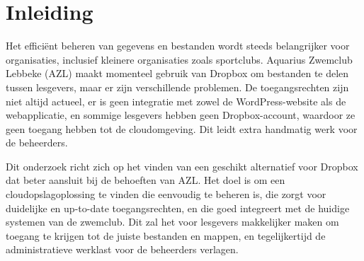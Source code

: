 


% 

\section{Inleiding}%
\label{sec:inleiding}

Het efficiënt beheren van gegevens en bestanden wordt steeds belangrijker voor organisaties, 
inclusief kleinere organisaties zoals sportclubs. Aquarius Zwemclub Lebbeke (AZL) maakt momenteel 
gebruik van Dropbox om bestanden te delen tussen lesgevers, maar er zijn verschillende problemen. 
De toegangsrechten zijn niet altijd actueel, er is geen integratie met zowel de WordPress-website als de webapplicatie, en sommige 
lesgevers hebben geen Dropbox-account, waardoor ze geen toegang hebben tot de cloudomgeving. 
Dit leidt extra handmatig werk voor de beheerders.

Dit onderzoek richt zich op het vinden van een geschikt alternatief voor Dropbox dat beter aansluit 
bij de behoeften van AZL. Het doel is om een cloudopslagoplossing te vinden die eenvoudig te beheren is, 
die zorgt voor duidelijke en up-to-date toegangsrechten, en die goed integreert met de huidige systemen van de zwemclub. 
Dit zal het voor lesgevers makkelijker maken om toegang te krijgen tot de juiste bestanden en mappen, en tegelijkertijd de 
administratieve werklast voor de beheerders verlagen.

